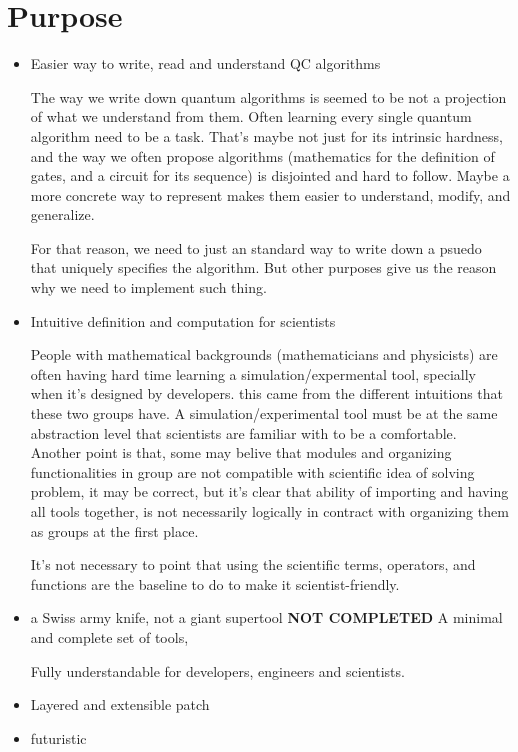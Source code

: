 \documentclass[a4paper,11pt]{article}
\begin{document}
\section{Purpose}
\begin{itemize}
\item Easier way to write, read and understand QC algorithms

The way we write down quantum algorithms is seemed to be not a projection of what we understand from them. Often learning every single quantum algorithm need to be a task. That's maybe not just for its intrinsic hardness, and the way we often propose algorithms (mathematics for the definition of gates, and a circuit for its sequence) is disjointed and hard to follow. Maybe a more concrete way to represent makes them easier to understand, modify, and generalize.

For that reason, we need to just an standard way to write down a psuedo that uniquely specifies the algorithm. But other purposes give us the reason why we need to implement such thing.

\item Intuitive definition and computation for scientists

People with mathematical backgrounds (mathematicians and physicists) are often having hard time learning a simulation/expermental tool, specially when it's designed by developers. this came from the different intuitions that these two groups have.
A simulation/experimental tool must be at the same abstraction level that scientists are familiar with to be a comfortable. Another point is that, some may belive that modules and organizing functionalities in group are not compatible with scientific idea of solving problem, it may be correct, but it's clear that ability of importing and having all tools together, is not necessarily logically in contract with organizing them as groups at the first place.

It's not necessary to point that using the scientific terms, operators, and functions are the baseline to do to make it scientist-friendly. 

\item a Swiss army knife, not a giant supertool
\textbf{NOT COMPLETED}
A minimal and complete set of tools, 

Fully understandable for developers, engineers and scientists.

\item Layered and extensible patch

\item futuristic
\end{itemize}
\end{document}
